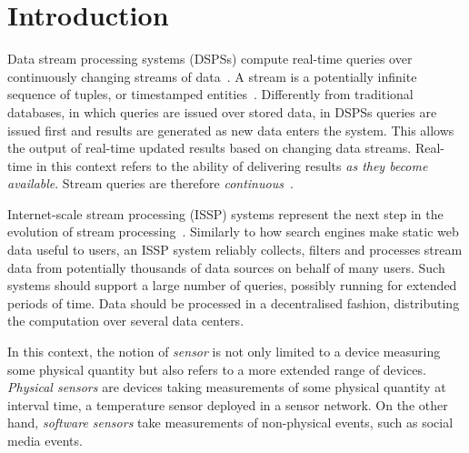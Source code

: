 \chapter{Introduction}
\label{ch:introduction}

Data stream processing systems (DSPSs) compute real-time queries over
continuously changing streams of data~\cite{8-reqs}. A stream is a potentially infinite sequence of tuples, or timestamped
entities~\cite{cql}. Differently from traditional databases, in which queries are issued over stored
data, in DSPSs queries are issued first and results are generated as new data enters the system.
This allows the output of real-time updated results based on changing data
streams. Real-time in this context refers to the ability of delivering results \emph{as they become
available}. Stream queries are therefore \emph{continuous}~\cite{cont-queries}.

Internet-scale stream processing (ISSP) systems represent the next step in the evolution of stream
processing~\cite{dissp-challanges}.
Similarly to how search engines make static web data useful to users, an ISSP system reliably
collects, filters and processes stream data from potentially thousands of data sources on behalf of many
users. Such systems should support a large number of queries, possibly running for extended periods of
time. Data should be processed in a decentralised fashion, distributing the computation over several data
centers.

In this context, the notion of \emph{sensor} is not only limited to a device measuring some physical
quantity but also refers to a more extended range of devices. \emph{Physical sensors} are devices taking
measurements of some physical quantity at interval time, \eg a temperature sensor deployed in a
sensor network. On the other hand, \emph{software sensors} take measurements of non-physical events,
such as social media events.

